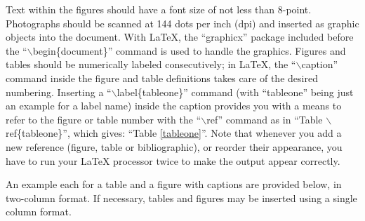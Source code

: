 \documentclass[letterpaper,10pt,twocolumn]{../aspe}
\begin{document}
Text within the figures should have a font size of not less than 8-point.
Photographs should be scanned at 144 dots per inch (dpi) and inserted as
graphic objects into the document. With LaTeX, the ``graphicx'' package
included before the ``$\backslash$begin\{document\}'' command is used to
handle the
graphics.  Figures and tables should be numerically labeled consecutively;
in LaTeX, the ``$\backslash$caption'' command inside the figure and table
definitions takes care of the desired numbering.  Inserting a
``$\backslash$label\{tableone\}'' command (with ``tableone'' being just an
example for a label name) inside the caption provides you with a means to
refer to the figure or table number with the ``$\backslash$ref'' command as in
``Table $\backslash$ref\{tableone\}'', which gives: ``Table \ref{tableone}''.
Note that whenever you add a new reference (figure, table or bibliographic),
or reorder their appearance, you have to run your LaTeX processor twice
to make the output appear correctly.

An example each for a table and a figure with captions are provided below,
in two-column format.
If necessary, tables and figures may be inserted using a single column
format.
\end{document}
